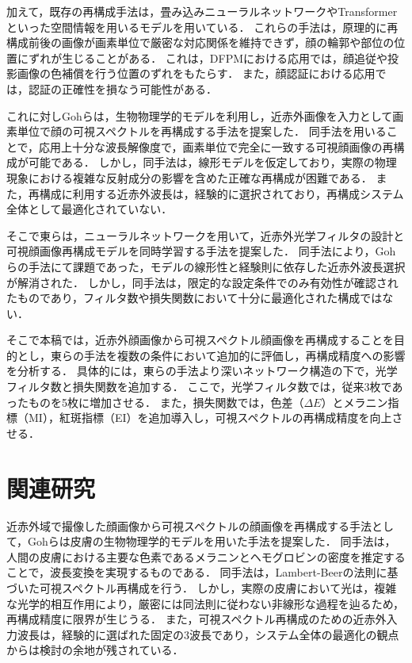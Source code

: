 \documentclass[MIRU,submit]{miru2026j}
\begin{document}
加えて，既存の再構成手法は，畳み込みニューラルネットワークやTransformerといった空間情報を用いるモデルを用いている．
これらの手法は，原理的に再構成前後の画像が画素単位で厳密な対応関係を維持できず，顔の輪郭や部位の位置にずれが生じることがある．
これは，DFPMにおける応用では，顔追従や投影画像の色補償を行う位置のずれをもたらす．
また，顔認証における応用では，認証の正確性を損なう可能性がある．

これに対しGohらは，生物物理学的モデルを利用し，近赤外画像を入力として画素単位で顔の可視スペクトルを再構成する手法を提案した\cite{proc:goh}．
同手法を用いることで，応用上十分な波長解像度で，画素単位で完全に一致する可視顔画像の再構成が可能である．
しかし，同手法は，線形モデルを仮定しており，実際の物理現象における複雑な反射成分の影響を含めた正確な再構成が困難である．
また，再構成に利用する近赤外波長は，経験的に選択されており，再構成システム全体として最適化されていない．

そこで東らは，ニューラルネットワークを用いて，近赤外光学フィルタの設計と可視顔画像再構成モデルを同時学習する手法を提案した\cite{proc:higashi}．
同手法により，Gohらの手法にて課題であった，モデルの線形性と経験則に依存した近赤外波長選択が解消された．
しかし，同手法は，限定的な設定条件でのみ有効性が確認されたものであり，フィルタ数や損失関数において十分に最適化された構成ではない．

そこで本稿では，近赤外顔画像から可視スペクトル顔画像を再構成することを目的とし，東らの手法\cite{proc:higashi}を複数の条件において追加的に評価し，再構成精度への影響を分析する．
具体的には，東らの手法\cite{proc:higashi}より深いネットワーク構造の下で，光学フィルタ数と損失関数を追加する．
ここで，光学フィルタ数では，従来3枚であったものを5枚に増加させる．
また，損失関数では，色差（$\Delta E$）とメラニン指標（MI），紅斑指標（EI）を追加導入し，可視スペクトルの再構成精度を向上させる．

\section{関連研究}

近赤外域で撮像した顔画像から可視スペクトルの顔画像を再構成する手法として，Gohらは皮膚の生物物理学的モデルを用いた手法を提案した\cite{proc:goh}．
同手法は，人間の皮膚における主要な色素であるメラニンとヘモグロビンの密度を推定することで，波長変換を実現するものである．
同手法は，Lambert-Beerの法則に基づいた可視スペクトル再構成を行う．
しかし，実際の皮膚において光は，複雑な光学的相互作用により，厳密には同法則に従わない非線形な過程を辿るため，再構成精度に限界が生じうる．
また，可視スペクトル再構成のための近赤外入力波長は，経験的に選ばれた固定の3波長であり，システム全体の最適化の観点からは検討の余地が残されている．
\end{document}
